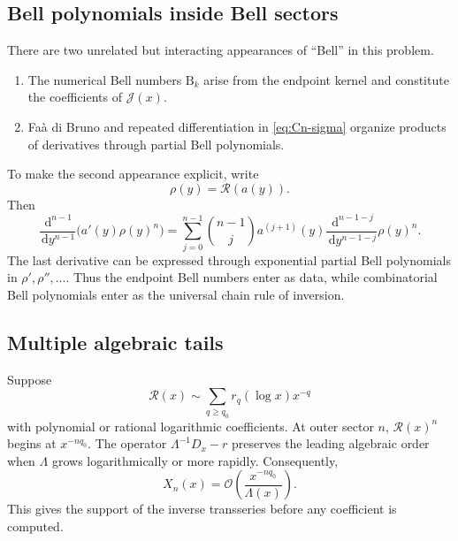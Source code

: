 \documentclass[11pt,a4paper]{article}
\numberwithin{equation}{section}
\theoremstyle{definition}
\theoremstyle{remark}
\newcommand{\dd}{\,\mathrm d}
\newcommand{\Ord}{\mathcal O}
\newcommand{\Bell}{\mathrm B}
\newcommand{\Tail}{\mathcal J}
\newcommand{\Lam}{\Lambda}
\newcommand{\Res}{\mathcal R}
\begin{document}
\subsection{Bell polynomials inside Bell sectors}

There are two unrelated but interacting appearances of ``Bell'' in this
problem.

\begin{enumerate}
\item The numerical Bell numbers $\Bell_k$ arise from the endpoint kernel
      and constitute the coefficients of $\Tail(x)$.
\item Fa\`a di Bruno and repeated differentiation in
      \eqref{eq:Cn-sigma} organize products of derivatives through partial
      Bell polynomials.
\end{enumerate}

To make the second appearance explicit, write
\begin{equation}\label{eq:rho-y}
 \rho(y)=\Res(a(y)).
\end{equation}
Then
\begin{equation}\label{eq:LB-Bell-polynomial}
 \frac{\dd^{n-1}}{\dd y^{n-1}}\bigl(a'(y)\rho(y)^n\bigr)
 =\sum_{j=0}^{n-1}\binom{n-1}{j}a^{(j+1)}(y)
 \frac{\dd^{n-1-j}}{\dd y^{n-1-j}}\rho(y)^n.
\end{equation}
The last derivative can be expressed through exponential partial Bell
polynomials in $\rho',\rho'',\ldots$.  Thus the endpoint Bell numbers enter
as data, while combinatorial Bell polynomials enter as the universal chain
rule of inversion.

\subsection{Multiple algebraic tails}

Suppose
\begin{equation}\label{eq:R-multiscale}
 \Res(x)\sim\sum_{q\ge q_0}r_q(\log x)x^{-q}
\end{equation}
with polynomial or rational logarithmic coefficients.  At outer sector $n$,
$\Res(x)^n$ begins at $x^{-nq_0}$.  The operator
$\Lam^{-1}D_x-r$ preserves the leading algebraic order when
$\Lam$ grows logarithmically or more rapidly.  Consequently,
\begin{equation}\label{eq:sector-leading-order-q0}
 X_n(x)=\Ord\!\left(
 \frac{x^{-nq_0}}{\Lam(x)}
 \right).
\end{equation}
This gives the support of the inverse transseries before any coefficient is
computed.
\end{document}
